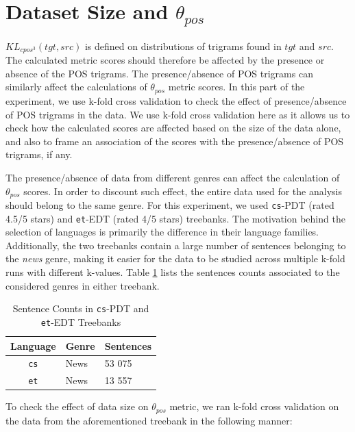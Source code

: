 \section{Dataset Size and \texorpdfstring{$\theta_{pos}$}{theta\_pos}}
\label{sec:pos-harmony-size}

$KL_{cpos^{3}}(tgt, src)$ is defined on distributions of trigrams found in $tgt$ and $src$. The calculated metric scores should therefore be affected by the presence or absence of the POS trigrams. The presence/absence of POS trigrams can similarly affect the calculations of $\theta_{pos}$ metric scores. In this part of the experiment, we use k-fold cross validation to check the effect of presence/absence of POS trigrams in the data. We use k-fold cross validation here as it allows us to check how the calculated scores are affected based on the size of the data alone, and also to frame an association of the scores with the presence/absence of POS trigrams, if any. 

The presence/absence of data from different genres can affect the calculation of $\theta_{pos}$ scores. In order to discount such effect, the entire data used for the analysis should belong to the same genre. For this experiment, we used \verb|cs|-PDT (rated 4.5/5 stars) and \verb|et|-EDT (rated 4/5 stars) treebanks. The motivation behind the selection of languages is primarily the difference in their language families. Additionally, the two treebanks contain a large number of sentences belonging to the \textit{news} genre, making it easier for the data to be studied across multiple k-fold runs with different k-values. Table \ref{tab:pos-harmony-size-datasize} lists the sentences counts associated to the considered genres in either treebank.

\begin{table}[H]
    \centering
    \begin{tabular}{|c|l|l|}
        \hline
        \textbf{Language} & \textbf{Genre} & \textbf{Sentences}\\
        \hline
        \texttt{cs} & News & 53 075 \\
        \hline
        \texttt{et} & News & 13 557 \\
        \hline
    \end{tabular}
    \caption{Sentence Counts in \texttt{cs}-PDT and \texttt{et}-EDT Treebanks}
    \label{tab:pos-harmony-size-datasize}
\end{table}


To check the effect of data size on $\theta_{pos}$ metric, we ran k-fold cross validation on the data from the aforementioned treebank in the following manner:

